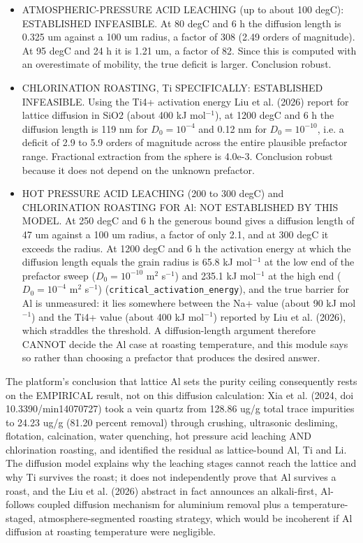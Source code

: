 \documentclass[10pt,a4paper,twoside]{report}
\begin{document}
\begin{itemize}
\item ATMOSPHERIC-PRESSURE ACID LEACHING (up to about 100 degC): ESTABLISHED INFEASIBLE. At 80 degC and 6 h the diffusion length is 0.325 um against a 100 um radius, a factor of 308 (2.49 orders of magnitude). At 95 degC and 24 h it is 1.21 um, a factor of 82. Since this is computed with an overestimate of mobility, the true deficit is larger. Conclusion robust.
\item CHLORINATION ROASTING, Ti SPECIFICALLY: ESTABLISHED INFEASIBLE. Using the Ti4+ activation energy Liu et al. (2026) report for lattice diffusion in SiO2 (about 400 kJ mol$^{-1}$), at 1200 degC and 6 h the diffusion length is 119 nm for $D_0 = 10^{-4}$ and 0.12 nm for $D_0 = 10^{-10}$, i.e. a deficit of 2.9 to 5.9 orders of magnitude across the entire plausible prefactor range. Fractional extraction from the sphere is 4.0e-3. Conclusion robust because it does not depend on the unknown prefactor.
\item HOT PRESSURE ACID LEACHING (200 to 300 degC) and CHLORINATION ROASTING FOR Al: NOT ESTABLISHED BY THIS MODEL. At 250 degC and 6 h the generous bound gives a diffusion length of 47 um against a 100 um radius, a factor of only 2.1, and at 300 degC it exceeds the radius. At 1200 degC and 6 h the activation energy at which the diffusion length equals the grain radius is 65.8 kJ mol$^{-1}$ at the low end of the prefactor sweep ($D_0 = 10^{-10}$ m$^{2}$ s$^{-1}$) and 235.1 kJ mol$^{-1}$ at the high end ($D_0 = 10^{-4}$ m$^{2}$ s$^{-1}$) (\texttt{critical\_activation\_energy}), and the true barrier for Al is unmeasured: it lies somewhere between the Na+ value (about 90 kJ mol$^{-1}$) and the Ti4+ value (about 400 kJ mol$^{-1}$) reported by Liu et al. (2026), which straddles the threshold. A diffusion-length argument therefore CANNOT decide the Al case at roasting temperature, and this module says so rather than choosing a prefactor that produces the desired answer.
\end{itemize}

The platform's conclusion that lattice Al sets the purity ceiling consequently rests on the EMPIRICAL result, not on this diffusion calculation: Xia et al. (2024, doi 10.3390/min14070727) took a vein quartz from 128.86 ug/g total trace impurities to 24.23 ug/g (81.20 percent removal) through crushing, ultrasonic desliming, flotation, calcination, water quenching, hot pressure acid leaching AND chlorination roasting, and identified the residual as lattice-bound Al, Ti and Li. The diffusion model explains why the leaching stages cannot reach the lattice and why Ti survives the roast; it does not independently prove that Al survives a roast, and the Liu et al. (2026) abstract in fact announces an alkali-first, Al-follows coupled diffusion mechanism for aluminium removal plus a temperature-staged, atmosphere-segmented roasting strategy, which would be incoherent if Al diffusion at roasting temperature were negligible.
\end{document}
